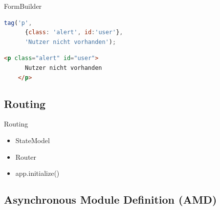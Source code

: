 \begin{frame}[fragile]{FormBuilder}
  \begin{lstlisting}[language=JavaScript,gobble=4]
    tag('p',
      {class: 'alert', id:'user'},
      'Nutzer nicht vorhanden');
  \end{lstlisting}
  \begin{lstlisting}[language=HTML,gobble=4]
    <p class="alert" id="user">
      Nutzer nicht vorhanden
    </p>
  \end{lstlisting}
\end{frame}

\subsection{Routing}

\begin{frame}{Routing}
  \begin{itemize}
    \item StateModel
    \item Router
    \item app.initialize()
  \end{itemize}
\end{frame}

\subsection[AMD]{Asynchronous Module Definition (AMD)}


